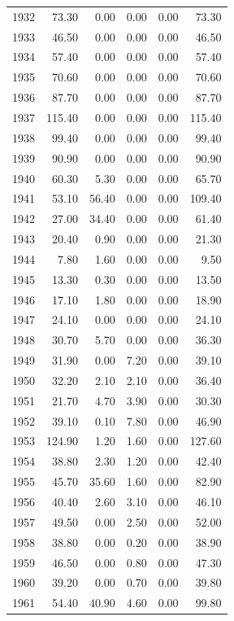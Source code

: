 \documentclass[12pt,]{article}
\begin{document}
\begin{longtable}{rrrrrr}
  1932 & 73.30 & 0.00 & 0.00 & 0.00 & 73.30 \\ 
  1933 & 46.50 & 0.00 & 0.00 & 0.00 & 46.50 \\ 
  1934 & 57.40 & 0.00 & 0.00 & 0.00 & 57.40 \\ 
  1935 & 70.60 & 0.00 & 0.00 & 0.00 & 70.60 \\ 
  1936 & 87.70 & 0.00 & 0.00 & 0.00 & 87.70 \\ 
  1937 & 115.40 & 0.00 & 0.00 & 0.00 & 115.40 \\ 
  1938 & 99.40 & 0.00 & 0.00 & 0.00 & 99.40 \\ 
  1939 & 90.90 & 0.00 & 0.00 & 0.00 & 90.90 \\ 
  1940 & 60.30 & 5.30 & 0.00 & 0.00 & 65.70 \\ 
  1941 & 53.10 & 56.40 & 0.00 & 0.00 & 109.40 \\ 
  1942 & 27.00 & 34.40 & 0.00 & 0.00 & 61.40 \\ 
  1943 & 20.40 & 0.90 & 0.00 & 0.00 & 21.30 \\ 
  1944 & 7.80 & 1.60 & 0.00 & 0.00 & 9.50 \\ 
  1945 & 13.30 & 0.30 & 0.00 & 0.00 & 13.50 \\ 
  1946 & 17.10 & 1.80 & 0.00 & 0.00 & 18.90 \\ 
  1947 & 24.10 & 0.00 & 0.00 & 0.00 & 24.10 \\ 
  1948 & 30.70 & 5.70 & 0.00 & 0.00 & 36.30 \\ 
  1949 & 31.90 & 0.00 & 7.20 & 0.00 & 39.10 \\ 
  1950 & 32.20 & 2.10 & 2.10 & 0.00 & 36.40 \\ 
  1951 & 21.70 & 4.70 & 3.90 & 0.00 & 30.30 \\ 
  1952 & 39.10 & 0.10 & 7.80 & 0.00 & 46.90 \\ 
  1953 & 124.90 & 1.20 & 1.60 & 0.00 & 127.60 \\ 
  1954 & 38.80 & 2.30 & 1.20 & 0.00 & 42.40 \\ 
  1955 & 45.70 & 35.60 & 1.60 & 0.00 & 82.90 \\ 
  1956 & 40.40 & 2.60 & 3.10 & 0.00 & 46.10 \\ 
  1957 & 49.50 & 0.00 & 2.50 & 0.00 & 52.00 \\ 
  1958 & 38.80 & 0.00 & 0.20 & 0.00 & 38.90 \\ 
  1959 & 46.50 & 0.00 & 0.80 & 0.00 & 47.30 \\ 
  1960 & 39.20 & 0.00 & 0.70 & 0.00 & 39.80 \\ 
  1961 & 54.40 & 40.90 & 4.60 & 0.00 & 99.80 \\ 

\end{longtable}
\end{document}
